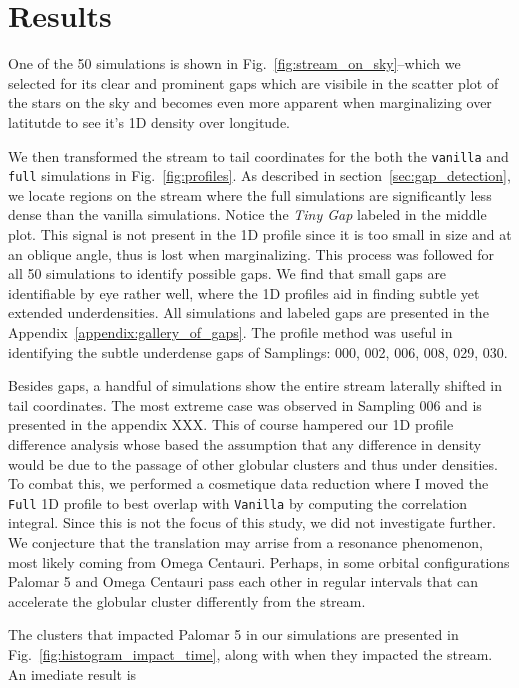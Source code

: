 \documentclass[draft]{aa}
\begin{document}
\section{Results}

  One of the 50 simulations is shown in Fig.~\ref{fig:stream_on_sky}--which we selected for its clear and prominent gaps which are visibile in the scatter plot of the stars on the sky and becomes even more apparent when marginalizing over latitutde to see it's 1D density over longitude. 

  We then transformed the stream to tail coordinates for the both the \texttt{vanilla} and \texttt{full} simulations in Fig.~\ref{fig:profiles}. As described in section~\ref{sec:gap_detection}, we locate regions on the stream where the full simulations are significantly less dense than the vanilla simulations. Notice the \textit{Tiny Gap} labeled in the middle plot. This signal is not present in the 1D profile since it is too small in size and at an oblique angle, thus is lost when marginalizing. This process was followed for all 50 simulations to identify possible gaps. We find that small gaps are identifiable by eye rather well, where the 1D profiles aid in finding subtle yet extended underdensities. All simulations and labeled gaps are presented in the Appendix~\ref{appendix:gallery_of_gaps}. The profile method was useful in identifying the subtle underdense gaps of Samplings: 000, 002, 006, 008, 029, 030. 
  
  Besides gaps, a handful of simulations show the entire stream laterally shifted in tail coordinates. The most extreme case was observed in Sampling 006 and is presented in the appendix XXX. This of course hampered our 1D profile difference analysis whose based the assumption that any difference in density would be due to the passage of other globular clusters and thus under densities. To combat this, we performed a cosmetique data reduction where I moved the \texttt{Full} 1D profile to best overlap with \texttt{Vanilla} by computing the correlation integral. Since this is not the focus of this study, we did not investigate further. We conjecture that the translation may arrise from a resonance phenomenon, most likely coming from Omega Centauri. Perhaps, in some orbital configurations Palomar 5 and Omega Centauri pass each other in regular intervals that can accelerate the globular cluster differently from the stream. 

  The clusters that impacted Palomar 5 in our simulations are presented in Fig.~\ref{fig:histogram_impact_time}, along with when they impacted the stream. An imediate result is 
\end{document}

